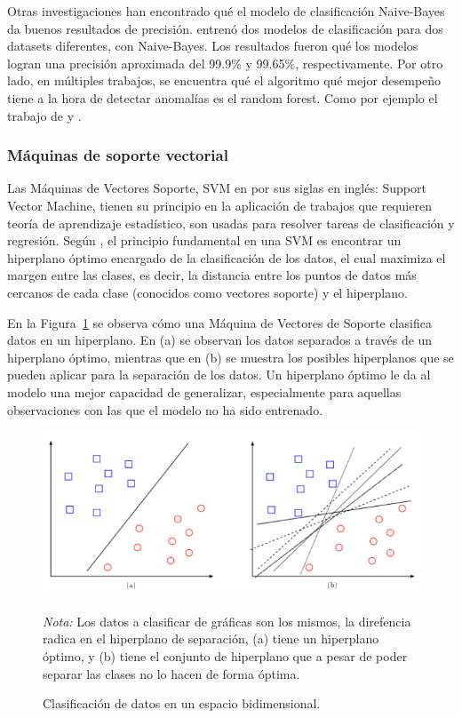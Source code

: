 \documentclass[11pt,a4paper,spanish]{book}
\numberwithin{equation}{chapter}
\numberwithin{figure}{chapter}
\begin{document}
Otras investigaciones han encontrado qué el modelo de clasificación Naive-Bayes da 
buenos resultados de precisión. \cite{chen2016xgboost} entrenó dos modelos de 
clasificación para dos datasets diferentes, con Naive-Bayes. Los resultados fueron qué 
los modelos logran una precisión aproximada del 99.9\% y 99.65\%, respectivamente. 
Por otro lado, en múltiples trabajos, se encuentra qué el algoritmo qué mejor desempeño 
tiene a la hora de detectar anomalías es el random forest. Como por ejemplo el trabajo 
de \cite{sharma2022predictive} y \cite{yu2025tkeo}.


\subsubsection{Máquinas de soporte vectorial}

Las Máquinas de Vectores Soporte, SVM en por sus siglas en inglés: Support Vector 
Machine, tienen su principio en la aplicación de trabajos que requieren teoría de 
aprendizaje estadístico, son usadas para resolver tareas de clasificación y regresión. 
Según \cite{amat2017maquinas}, el principio fundamental en una SVM es encontrar un 
hiperplano óptimo encargado de la clasificación de los datos, el cual maximiza el 
margen entre las clases, es decir, la distancia entre los puntos de datos más cercanos 
de cada clase (conocidos como vectores soporte) y el hiperplano. 


En la Figura~\ref{fig:figSVM} se observa cómo una Máquina de Vectores de Soporte clasifica 
datos en un hiperplano. En (a) se observan 
los datos separados a través de un hiperplano óptimo, mientras que en (b) se muestra 
los posibles hiperplanos que se pueden aplicar para la separación de los datos. Un hiperplano
óptimo le da al modelo una mejor capacidad de generalizar, especialmente para aquellas
observaciones con las que el modelo no ha sido entrenado.


\begin{figure}[H]
    \caption{Clasificación de datos en un espacio bidimensional. \protect\cite{suarez2014svm}}
    \centering
    \includegraphics[width=1.0\textwidth]{media/svm-dm.png}
    \label{fig:figSVM}
	\parbox{\textwidth}{\footnotesize \textit{Nota:} Los datos a clasificar de gráficas son
	los mismos, la direfencia radica en el hiperplano de separación, (a) tiene un hiperplano
	óptimo, y (b) tiene el conjunto de hiperplano que a pesar de poder separar las clases 
	no lo hacen de forma óptima.}
\end{figure}
\end{document}
